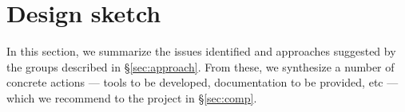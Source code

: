 \section{Design sketch}
\label{sec:design}

In this section, we summarize the issues identified and approaches suggested
by the groups described in \S\ref{sec:approach}. From these, we synthesize a
number of concrete actions --- tools to be developed, documentation to be
provided, etc --- which we recommend to the project in \S\ref{sec:comp}.




